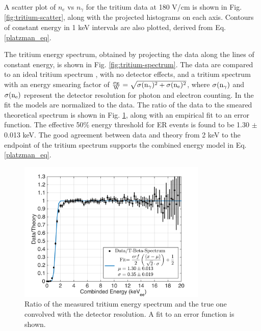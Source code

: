 
A scatter plot of $n_e$ vs $n_{\gamma}$ for the tritium data at 180 V/cm is shown in Fig. \ref{fig:tritium-scatter}, along with the projected histograms on each axis. Contours of constant energy in 1 keV intervals are also plotted, derived from Eq. \ref{platzman_eq}. 


The tritium energy spectrum, obtained by projecting the data along the lines of constant energy, is shown in Fig. \ref{fig:tritium-spectrum}. The data are compared to an ideal tritium spectrum \cite{Tritium_Eq_Simpson}, with no detector effects, and a tritium spectrum with an energy smearing factor of $\rm \frac{\sigma_E}{W} = \sqrt{\sigma(n_{\gamma})^2 + \sigma(n_e)^2}$, where $\rm \sigma(n_{\gamma})$ and $\rm \sigma(n_e)$ represent the detector resolution for photon and electron counting. In the fit the models are normalized to the data. The ratio of the data to the smeared theoretical spectrum is shown in Fig. \ref{fig:ER-threshold}, along with an empirical fit to an error function. The effective 50\% energy threshold for ER events is found to be 1.30 $\pm$ 0.013 keV. The good agreement between data and theory from 2 keV to the endpoint of the tritium spectrum supports the combined energy model in Eq.\ref{platzman_eq}.

\begin{figure}[h!]\centering
\includegraphics[width=90mm]{fig/E_Thres_Fit.png}
\caption{Ratio of the measured tritium energy spectrum and the true one convolved with the detector resolution. A fit to an error function is shown.}
\label{fig:ER-threshold}
\end{figure}




